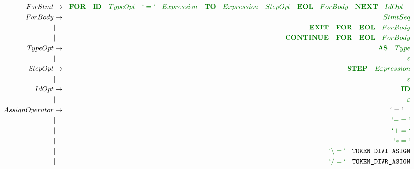 \documentclass[a4paper,11pt,landscape,leqno]{article}
\begin{document}
\begin{eqnarray}
ForStmt &    \rightarrow    &  \textcolor{green1}{\textbf{FOR}\quad \textbf{ID}\quad TypeOpt\quad `=`\quad Expression\quad \textbf{TO}\quad Expression\quad StepOpt\quad \textbf{EOL}\quad ForBody\quad \textbf{NEXT}\quad IdOpt\quad} \\
ForBody    &    \rightarrow    &    \textcolor{green1}{StmtSeq}  \\
&   |       &       \textcolor{green1}{\textbf{EXIT}\quad \textbf{FOR}\quad \textbf{EOL}\quad ForBody}   \\
&   |       &       \textcolor{green1}{\textbf{CONTINUE}\quad \textbf{FOR}\quad \textbf{EOL}\quad ForBody}    \\
TypeOpt & \rightarrow  & \textcolor{green1}{\textbf{AS}\quad Type} \\
        & | &   \textcolor{green1}{\varepsilon} \\
StepOpt & \rightarrow  & \textcolor{green1}{\textbf{STEP}\quad Expression} \\
        & | &   \textcolor{green1}{\varepsilon} \\
IdOpt   & \rightarrow & \textcolor{green1}{\textbf{ID}} \\
        & | &  \textcolor{green1}{\varepsilon} \\
AssignOperator  &    \rightarrow    &    `=` \quad      \\
        &   |       &   \textcolor{green1}{`-=`}    \\
        &   |       &   \textcolor{green1}{`+=`}    \\
        &   |       &   \textcolor{green1}{`*=`}    \\
        &   |       &   \textcolor{green1}{`\backslash =`}\quad \textrm{\texttt{TOKEN\_DIVI\_ASIGN}}    \\
        &   |       &   \textcolor{green1}{`/=`}\quad \textrm{\texttt{TOKEN\_DIVR\_ASIGN}}\\

\end{eqnarray}
\end{document}
